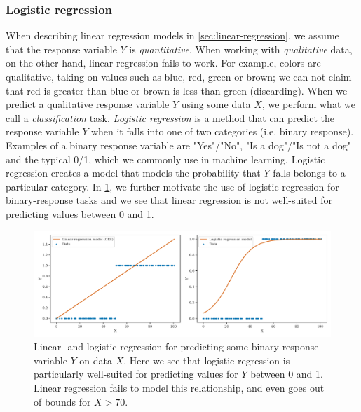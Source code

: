 \subsubsection{Logistic regression}
\label{sec:logistic-regression}
When describing linear regression models in \cref{sec:linear-regression}, we assume that the response variable $Y$ is \textit{quantitative}. When working with \textit{qualitative} data, on the other hand, linear regression fails to work. For example, colors are qualitative, taking on values such as blue, red, green or brown; we can not claim that red is greater than blue or brown is less than green (discarding). When we predict a qualitative response variable $Y$ using some data $X$, we perform what we call a \textit{classification} task. \textit{Logistic regression} is a method that can predict the response variable $Y$ when it falls into one of two categories (i.e. binary response). Examples of a binary response variable are "Yes"/"No", "Is a dog"/"Is not a dog" and the typical 0/1, which we commonly use in machine learning. Logistic regression creates a model that models the probability that $Y$ falls belongs to a particular category. In \cref{fig:logistic-regression-example}, we further motivate the use of logistic regression for binary-response tasks and we see that linear regression is not well-suited for predicting values between 0 and 1.
\begin{figure}[H]
    \centering
    \includegraphics[width=\textwidth]{thesis/figures/logistic-regression-example.pdf}
    \caption{Linear- and logistic regression for predicting some binary response variable $Y$ on data $X$. Here we see that logistic regression is particularly well-suited for predicting values for $Y$ between 0 and 1. Linear regression fails to model this relationship, and even goes out of bounds for $X > 70$.}
    \label{fig:logistic-regression-example}
\end{figure}

